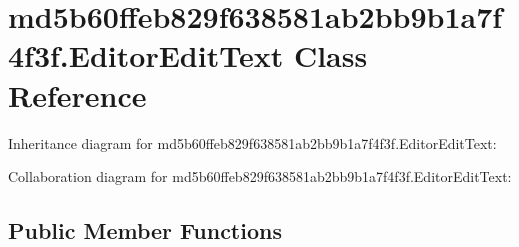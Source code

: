 \hypertarget{classmd5b60ffeb829f638581ab2bb9b1a7f4f3f_1_1_editor_edit_text}{}\section{md5b60ffeb829f638581ab2bb9b1a7f4f3f.\+Editor\+Edit\+Text Class Reference}
\label{classmd5b60ffeb829f638581ab2bb9b1a7f4f3f_1_1_editor_edit_text}


Inheritance diagram for md5b60ffeb829f638581ab2bb9b1a7f4f3f.\+Editor\+Edit\+Text\+:


Collaboration diagram for md5b60ffeb829f638581ab2bb9b1a7f4f3f.\+Editor\+Edit\+Text\+:
\subsection*{Public Member Functions}
